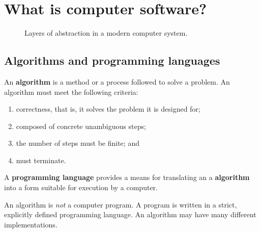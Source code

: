 \chapter{What is computer software?}

\begin{figure}
    \centering
    \caption{Layers of abstraction in a modern computer system.}
\end{figure}

\section{Algorithms and programming languages}

\begin{definition}
    An \textbf{algorithm} is a method or a process followed to solve a problem. An algorithm must meet the following criteria:
    \begin{enumerate}
        \item correctness, that is, it solves the problem it is designed for;
        \item composed of concrete unambiguous steps;
        \item the number of steps must be finite; and
        \item must terminate.
    \end{enumerate}
\end{definition}

\begin{definition}
    A \textbf{programming language} provides a means for translating an a \textbf{algorithm} into a form suitable for execution by a computer.
\end{definition}

An algorithm is \emph{not} a computer program. A program is written in a strict, explicitly defined programming language. An algorithm may have many different implementations.

